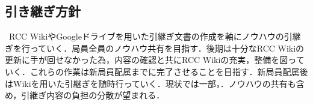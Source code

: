 \subsection*{引き継ぎ方針}


\ RCC WikiやGoogleドライブを用いた引継ぎ文書の作成を軸にノウハウの引継ぎを行っていく．局員全員のノウハウ共有を目指す．後期は十分なRCC Wikiの更新に手が回せなかった為，内容の確認と共にRCC Wikiの充実，整備を図っていく．これらの作業は新局員配属までに完了させることを目指す．新局員配属後はWikiを用いた引継ぎを随時行っていく．現状では一部，．ノウハウの共有も含め，引継ぎ内容の負担の分散が望まれる．
